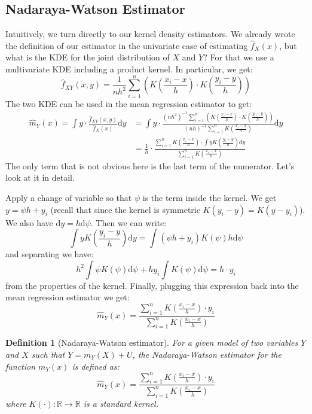 \documentclass[12pt]{report}
\def\D{\mathrm{d}}
\newtheorem{definition}{Definition}[chapter]
\def\D{\mathrm{d}}
\def\D{\mathrm{d}}
\begin{document}
\subsection{Nadaraya-Watson Estimator}

Intuitively, we turn directly to our kernel density estimators. We already wrote the definition of our estimator in the univariate case of estimating $\hat f_X(x)$, but what is the KDE for the joint distribution of $X$ and $Y$? For that we use a multivariate KDE including a product kernel. In particular, we get: $$\hat f_{XY}(x, y) = \frac{1}{nh^2} \sum_{i=1}^{n} \left( K\left(\frac{x_i - x}{h}\right)\cdot K\left(\frac{y_i - y}{h}\right)\right) $$ The two KDE can be used in the mean regression estimator to get: \begin{align*}
\hat m_Y(x) = \int y\cdot \frac{\hat f_{XY}(x, y)}{\hat f_X(x)}\D y & = \int y\cdot \frac{(nh^2)^{-1} \sum_{i=1}^{n} \left( K\left(\frac{x_i - x}{h}\right)\cdot K\left(\frac{y_i - y}{h}\right)\right)}{(nh)^{-1} \sum_{i=1}^{n} K\left(\frac{x_i - x}{h}\right)} \D y \\
& = \frac{1}{h}\cdot \frac{\sum_{i=1}^{n} K\left(\frac{x_i - x}{h}\right)\cdot \int y K\left(\frac{y_i - y}{h}\right)\D y }{\sum_{i=1}^{n} K\left(\frac{x_i - x}{h}\right)}  
\end{align*} The only term that is not obvious here is the last term of the numerator. Let's look at it in detail.

Apply a change of variable so that $\psi$ is the term inside the kernel. We get $y = \psi h + y_i$ (recall that since the kernel is symmetric $K(y_i - y) = K(y - y_i)$). We also have $\D y = h\D \psi$. Then we can write: $$ \int y K\left(\frac{y_i - y}{h}\right)\D y = \int (\psi h + y_i) K\left(\psi\right)h\D \psi $$ and separating we have: $$ h^2 \int \psi  K\left(\psi\right)\D \psi + h y_i \int K\left(\psi\right)\D \psi = h\cdot y_i $$ from the properties of the kernel. Finally, plugging this expression back into the mean regression estimator we get: $$ \hat m_Y(x) = \frac{\sum_{i=1}^{n} K\left(\frac{x_i - x}{h}\right)\cdot y_i }{\sum_{i=1}^{n} K\left(\frac{x_i - x}{h}\right)} $$

\begin{definition}[Nadaraya-Watson estimator]
For a given model of two variables $Y$ and $X$ such that $Y = m_Y(X) + U $, the Nadaraya-Watson estimator for the function $m_Y(x)$ is defined as: $$ \hat m_Y(x) = \frac{\sum_{i=1}^{n} K\left(\frac{x_i - x}{h}\right)\cdot y_i }{\sum_{i=1}^{n} K\left(\frac{x_i - x}{h}\right)} $$ where $K(\cdot):\mathbb{R}\to\mathbb{R}$ is a standard kernel.
\end{definition}
\end{document}
